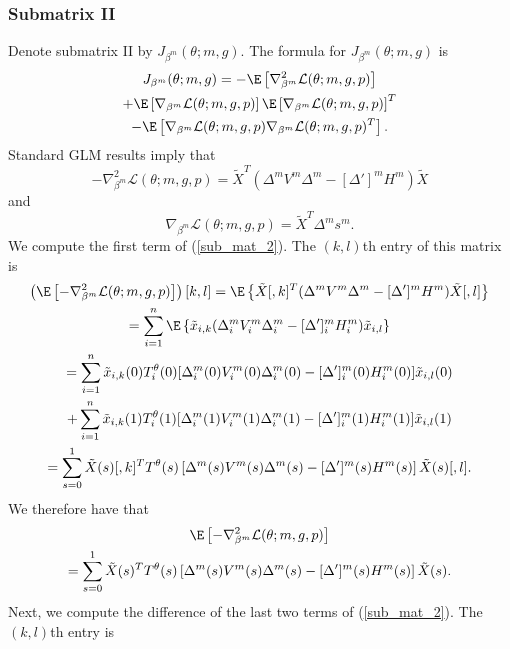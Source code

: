 \documentclass[12pt]{article}
\begin{document}
\begin{appendices}
\subsubsection*{Submatrix II}
Denote submatrix II by $J_{\beta^m}(\theta; m, g).$ The formula for $J_{\beta^m}(\theta; m, g)$ is
\begin{multline}\label{sub_mat_2}
J_{\beta^m}(\theta; m, g) = -\E \left[\nabla_{\beta^m}^2 \mathcal{L}(\theta; m, g, p) \right] \\ + \E\left[\nabla_{\beta^m} \mathcal{L}(\theta; m, g, p) \right] \E\left[ \nabla_{\beta^m} \mathcal{L}(\theta; m, g, p) \right]^T \\ - \E\left[ \nabla_{\beta^m} \mathcal{L}(\theta; m, g, p) \nabla_{\beta^m} \mathcal{L}(\theta; m, g, p)^T  \right].
\end{multline}
Standard GLM results imply that
$$ -\nabla_{\beta^m}^2 \mathcal{L}(\theta; m, g, p) = \tilde{X}^T ( \Delta^m V^m \Delta^m - [\Delta']^m H^m ) \tilde{X}$$ and $$\nabla_{\beta^m}\mathcal{L}(\theta; m, g, p) = \tilde{X}^T \Delta^m s^m.$$
We compute the first term of (\ref{sub_mat_2}). The $(k,l)$th entry of this matrix is
\begin{multline*}
\left( \E\left[-\nabla_{\beta^m}^2 \mathcal{L}(\theta; m, g, p)\right]\right)[k,l] = \E \left\{\tilde{X}[,k]^T (\Delta^m V^m \Delta^m - [\Delta']^mH^m) \tilde{X}[,l] \right\} \\ = \sum_{i=1}^n \E \left\{ \tilde{x}_{i,k} (\Delta^m_{i} V^m_{i} \Delta^m_{i} - [\Delta']^m_{i} H^m_{i}) \tilde{x}_{i,l} \right\} \\ = \sum_{i=1}^n \tilde{x}_{i,k}(0) T_i^{\theta}(0) [{\Delta}^m_i(0)  {V}^m_i(0) {\Delta}^m_i(0) - [\Delta']^m_i(0) {H}^m_i(0)] \tilde{x}_{i,l}(0) \\ + \sum_{i=1}^n \tilde{x}_{i,k}(1) T_i^{\theta}(1) [ {\Delta}^m_i(1)  {V}^m_i(1) {\Delta}^m_i(1) - [{\Delta}']^m_i(1) {H}^m_i(1)] \tilde{x}_{i,l}(1) \\ = \sum_{s = 0}^1 \tilde{X}(s)[,k]^T {T}^{\theta}(s) \left[ {\Delta}^m(s) {V}^m(s) {\Delta}^m(s) - [{\Delta}']^m(s) {H}^m(s) \right] \tilde{X}(s)[,l].
\end{multline*}
We therefore have that
\begin{multline}\label{sub_mat_2_1}
\E\left[-\nabla_{\beta^m}^2 \mathcal{L}(\theta; m, g, p)\right] \\ = \sum_{s=0}^1 \tilde{X}(s)^T T^{\theta}(s) \left[ {\Delta}^m(s) {V}^m(s) {\Delta}^m(s) - [{\Delta}']^m(s) {H}^m(s) \right] \tilde{X}(s).
\end{multline}
Next, we compute the difference of the last two terms of (\ref{sub_mat_2}). The $(k,l)$th entry is

\end{appendices}
\end{document}
